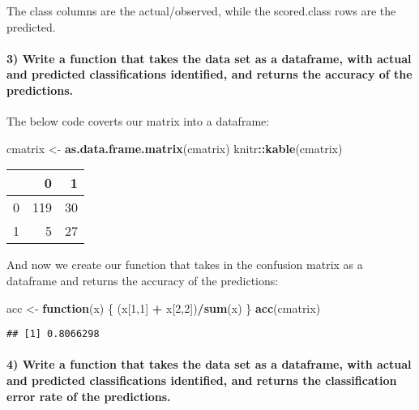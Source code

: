 \documentclass[]{article}
\newenvironment{Shaded}{\begin{snugshade}}{\end{snugshade}}
\newcommand{\KeywordTok}[1]{\textcolor[rgb]{0.13,0.29,0.53}{\textbf{#1}}}
\newcommand{\DecValTok}[1]{\textcolor[rgb]{0.00,0.00,0.81}{#1}}
\newcommand{\StringTok}[1]{\textcolor[rgb]{0.31,0.60,0.02}{#1}}
\newcommand{\ControlFlowTok}[1]{\textcolor[rgb]{0.13,0.29,0.53}{\textbf{#1}}}
\newcommand{\OperatorTok}[1]{\textcolor[rgb]{0.81,0.36,0.00}{\textbf{#1}}}
\newcommand{\NormalTok}[1]{#1}
\let\oldparagraph\paragraph
\renewcommand{\paragraph}[1]{\oldparagraph{#1}\mbox{}}
\begin{document}
The class columns are the actual/observed, while the scored.class rows
are the predicted.

\paragraph{3) Write a function that takes the data set as a dataframe,
with actual and predicted classifications identified, and returns the
accuracy of the
predictions.}\label{write-a-function-that-takes-the-data-set-as-a-dataframe-with-actual-and-predicted-classifications-identified-and-returns-the-accuracy-of-the-predictions.}

The below code coverts our matrix into a dataframe:

\begin{Shaded}
\begin{Highlighting}[]
\NormalTok{cmatrix <-}\StringTok{ }\KeywordTok{as.data.frame.matrix}\NormalTok{(cmatrix)}
\NormalTok{knitr}\OperatorTok{::}\KeywordTok{kable}\NormalTok{(cmatrix)}
\end{Highlighting}
\end{Shaded}

\begin{longtable}[]{@{}lrr@{}}
\toprule
& 0 & 1\tabularnewline
\midrule
\endhead
0 & 119 & 30\tabularnewline
1 & 5 & 27\tabularnewline
\bottomrule
\end{longtable}

And now we create our function that takes in the confusion matrix as a
dataframe and returns the accuracy of the predictions:

\begin{Shaded}
\begin{Highlighting}[]
\NormalTok{acc <-}\StringTok{ }\ControlFlowTok{function}\NormalTok{(x) \{}
\NormalTok{  (x[}\DecValTok{1}\NormalTok{,}\DecValTok{1}\NormalTok{] }\OperatorTok{+}\StringTok{ }\NormalTok{x[}\DecValTok{2}\NormalTok{,}\DecValTok{2}\NormalTok{])}\OperatorTok{/}\KeywordTok{sum}\NormalTok{(x)}
\NormalTok{\}}
\KeywordTok{acc}\NormalTok{(cmatrix)}
\end{Highlighting}
\end{Shaded}

\begin{verbatim}
## [1] 0.8066298
\end{verbatim}

\paragraph{4) Write a function that takes the data set as a dataframe,
with actual and predicted classifications identified, and returns the
classification error rate of the
predictions.}\label{write-a-function-that-takes-the-data-set-as-a-dataframe-with-actual-and-predicted-classifications-identified-and-returns-the-classification-error-rate-of-the-predictions.}
\end{document}

